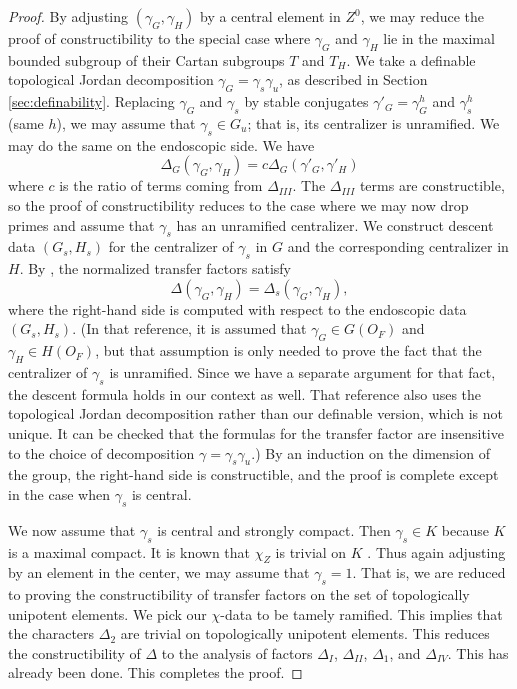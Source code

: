 \begin{proof}
By adjusting $(\gamma_G,\gamma_H)$ by a central element in $Z^0$, we
may reduce the proof of constructibility to the special case where
$\gamma_G$ and $\gamma_H$ lie in the maximal bounded subgroup of their
Cartan subgroups $T$ and $T_H$.  We take a definable topological
Jordan decomposition $\gamma_G = \gamma_s \gamma_u$, as described in
Section \ref{sec:definability}.  Replacing $\gamma_G$ and $\gamma_s$
by stable conjugates $\gamma'_G=\gamma_G^h$ and $\gamma_s^h$ (same
$h$), we may assume that $\gamma_s\in G_u$; that is, its centralizer
is unramified.  We may do the same on the endoscopic side.  We have
\[
\Delta_G(\gamma_G,\gamma_H) = c \Delta_G(\gamma'_G,\gamma'_H)
\]
where $c$ is the ratio of terms coming from $\Delta_{III}$.  The
$\Delta_{III}$ terms are constructible, so the proof of
constructibility reduces to the case where we may now drop primes and
assume that $\gamma_s$ has an unramified centralizer.  We construct
descent data $(G_s,H_s)$ for the centralizer of $\gamma_s$ in $G$ and
the corresponding centralizer in $H$.  By \cite{hales1993simple}, the
normalized transfer factors satisfy
\[
\Delta(\gamma_G,\gamma_H) = \Delta_s(\gamma_G,\gamma_H),
\]
where the right-hand side is computed with respect to the endoscopic
data $(G_s,H_s)$.  (In that reference, it is assumed that $\gamma_G\in
G(O_F)$ and $\gamma_H\in H(O_F)$, but that assumption is only needed
to prove the fact that the centralizer of $\gamma_s$ is unramified.
Since we have a separate argument for that fact, the descent formula
holds in our context as well. That reference also uses the topological
Jordan decomposition rather than our definable version, which is not
unique.  It can be checked that the formulas for the transfer factor are
insensitive to the choice of decomposition $\gamma=\gamma_s\gamma_u$.)
By an induction on the dimension of the group, the right-hand side is
constructible, and the proof is complete except in the case when
$\gamma_s$ is central.

We now assume that $\gamma_s$ is central and strongly compact.  Then
$\gamma_s\in K$ because $K$ is a maximal compact.  It is known that
$\chi_Z$ is trivial on $K$ \cite[Lemma
3.2]{hales1995fundamental}. Thus again adjusting by an element in the
center, we may assume that $\gamma_s=1$.  That is, we are reduced to
proving the constructibility of transfer factors on the set of
topologically unipotent elements.  We pick our $\chi$-data to be
tamely ramified.  This implies that the characters $\Delta_2$ are
trivial on topologically unipotent elements.  This reduces
the constructibility of $\Delta$ to the analysis of factors $\Delta_I$, $\Delta_{II}$,
$\Delta_1$, and $\Delta_{IV}$.  This has already been done.  This
completes the proof.
\end{proof}


